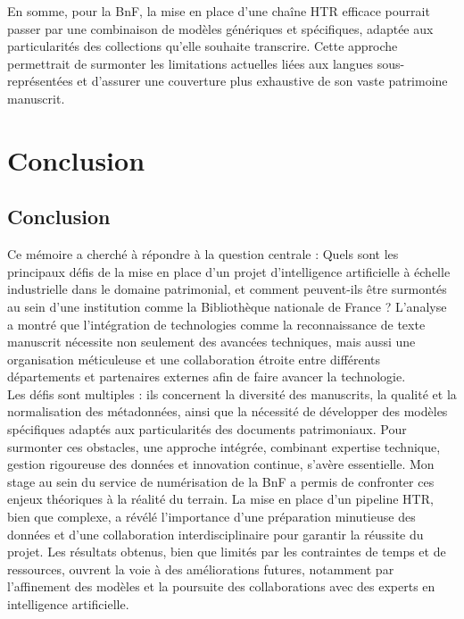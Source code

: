 \documentclass[a4paper,12pt,twoside]{book}
\begin{document}
	En somme, pour la BnF, la mise en place d’une chaîne HTR efficace pourrait passer par une combinaison de modèles génériques et spécifiques, adaptée aux particularités des collections qu’elle souhaite transcrire. Cette approche permettrait de surmonter les limitations actuelles liées aux langues sous-représentées et d’assurer une couverture plus exhaustive de son vaste patrimoine manuscrit.
	
	\part{Conclusion}
	\chapter*{Conclusion}
	
	Ce mémoire a cherché à répondre à la question centrale : Quels sont les principaux défis de la mise en place d’un projet d’intelligence artificielle à échelle industrielle dans le domaine patrimonial, et comment peuvent-ils être surmontés au sein d’une institution comme la Bibliothèque nationale de France ? L’analyse a montré que l’intégration de technologies comme la reconnaissance de texte manuscrit nécessite non seulement des avancées techniques, mais aussi une organisation méticuleuse et une collaboration étroite entre différents départements et partenaires externes afin de faire avancer la technologie.
	\\
	
	Les défis sont multiples : ils concernent la diversité des manuscrits, la qualité et la normalisation des métadonnées, ainsi que la nécessité de développer des modèles spécifiques adaptés aux particularités des documents patrimoniaux. Pour surmonter ces obstacles, une approche intégrée, combinant expertise technique, gestion rigoureuse des données et innovation continue, s’avère essentielle. Mon stage au sein du service de numérisation de la BnF a permis de confronter ces enjeux théoriques à la réalité du terrain. La mise en place d’un pipeline HTR, bien que complexe, a révélé l’importance d’une préparation minutieuse des données et d’une collaboration interdisciplinaire pour garantir la réussite du projet. Les résultats obtenus, bien que limités par les contraintes de temps et de ressources, ouvrent la voie à des améliorations futures, notamment par l’affinement des modèles et la poursuite des collaborations avec des experts en intelligence artificielle.
	\\
	
\end{document}
